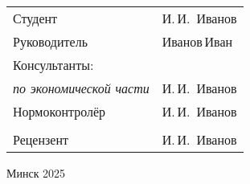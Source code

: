 \begin{titlepage}
\begin{center}
		\begin{tabular}{ p{}p{} }
			Студент & И.\,И.~Иванов \\
			Руководитель & Иванов\,Иван \\
			Консультанты: &\\
			\hspace*{3ex}\emph{по экономической части} & И.\,И.~Иванов \\
			Нормоконтролёр & И.\,И.~Иванов\\
			& \\
			Рецензент & И.\,И.~Иванов
		\end{tabular}
		
		\vfill
		{\normalsize Минск 2025}
	\end{center}
\end{titlepage}
